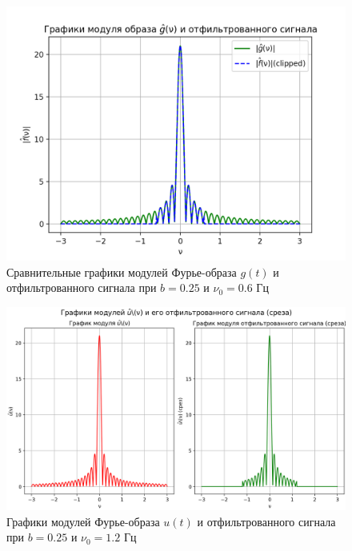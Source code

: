 \begin{figure}[ht!]
    \centering
    \includegraphics[scale=0.55]{media/1 task/high_freq/Fourier_Image_Comparison_0,25_-0,5975975975975976.png}
    \caption{Сравнительные графики модулей Фурье-образа $g(t)$ и отфильтрованного сигнала при $b=0.25$ и $\nu_0=0.6$ Гц}
    \label{fig:fourc_025_06}
\end{figure}

\begin{figure}[ht!]
    \centering
    \includegraphics[scale=0.55]{media/1 task/high_freq/Fourier_Image_0,25_-1,1981981981981982.png}
    \caption{Графики модулей Фурье-образа $u(t)$ и отфильтрованного сигнала при $b=0.25$ и $\nu_0=1.2$ Гц}
    \label{fig:four_025_12}
\end{figure}

